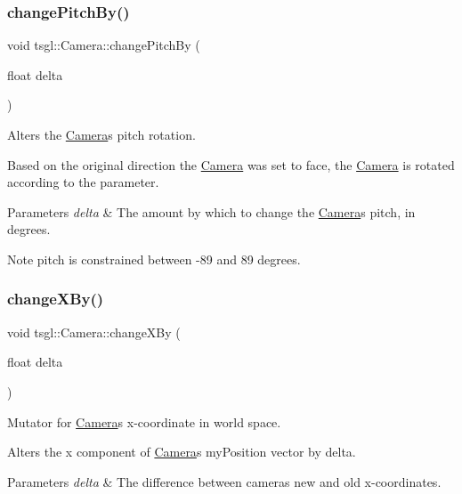 \subsubsection{\texorpdfstring{change\+Pitch\+By()}{changePitchBy()}}
{\footnotesize\ttfamily void tsgl\+::\+Camera\+::change\+Pitch\+By (\begin{DoxyParamCaption}\item[{float}]{delta }\end{DoxyParamCaption})}



Alters the \hyperlink{classtsgl_1_1_camera}{Camera}\textquotesingle{}s pitch rotation. 

Based on the original direction the \hyperlink{classtsgl_1_1_camera}{Camera} was set to face, the \hyperlink{classtsgl_1_1_camera}{Camera} is rotated according to the parameter. 
\begin{DoxyParams}{Parameters}
{\em delta} & The amount by which to change the \hyperlink{classtsgl_1_1_camera}{Camera}\textquotesingle{}s pitch, in degrees. \\
\hline
\end{DoxyParams}
\begin{DoxyNote}{Note}
pitch is constrained between -\/89 and 89 degrees. 
\end{DoxyNote}
\mbox{\label{classtsgl_1_1_camera_a011b8c82aff7e98b7c41aa6998006c56}} 
\subsubsection{\texorpdfstring{change\+X\+By()}{changeXBy()}}
{\footnotesize\ttfamily void tsgl\+::\+Camera\+::change\+X\+By (\begin{DoxyParamCaption}\item[{float}]{delta }\end{DoxyParamCaption})}



Mutator for \hyperlink{classtsgl_1_1_camera}{Camera}\textquotesingle{}s x-\/coordinate in world space. 

Alters the x component of \hyperlink{classtsgl_1_1_camera}{Camera}\textquotesingle{}s my\+Position vector by delta. 
\begin{DoxyParams}{Parameters}
{\em delta} & The difference between camera\textquotesingle{}s new and old x-\/coordinates. \\
\hline
\end{DoxyParams}
\mbox{\label{classtsgl_1_1_camera_ade60f005d962cde8397ea080251eba93}} 
